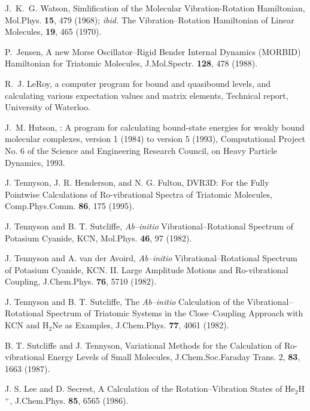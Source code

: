 \begin{thebibliography}{999}
J.~K.~G. Watson,
Simlification of the Molecular Vibration-Rotation
Hamiltonian,
Mol.Phys. {\bf 15}, 479 (1968);
{\it ibid.} 
The Vibration--Rotation Hamiltonian of Linear Molecules,
{\bf 19}, 465 (1970).



P.~Jensen,
A new Morse Oscillator--Rigid Bender Internal
Dynamics (MORBID) Hamiltonian for Triatomic Molecules,
\newblock J.Mol.Spectr. {\bf 128}, 478 (1988).

R.~J. Le{R}oy,
 a 
computer program for bound and quasibound levels, and
calculating various expectation values and matrix elements,
\newblock Technical report, University of Waterloo.

J.~M. Hutson,
: A program for calculating bound-state energies for weakly
bound molecular complexes, version 1 (1984) to version 5 (1993),
\newblock Computational Project No. 6 of the Science and Engineering Research
 Council, on Heavy Particle Dynamics, 1993.

J. Tennyson, J. R. Henderson, and N. G. Fulton,
DVR3D: For the Fully Pointwise Calculations of Ro-vibrational
Spectra of Triatomic Molecules,
Comp.Phys.Comm. {\bf 86}, 175 (1995).



J. Tennyson and B. T. Sutcliffe, 
{\it Ab--initio} Vibrational--Rotational Spectrum of Potasium Cyanide,
KCN,
Mol.Phys. {\bf 46}, 97 (1982).


J. Tennyson and A. van der Avoird, 
{\it Ab--initio} Vibrational--Rotational Spectrum
of Potasium Cyanide, KCN. II. Large Amplitude Motions
and Ro-vibrational Coupling,
J.Chem.Phys. 
{\bf 76}, 5710 (1982).


J. Tennyson and B. T. Sutcliffe, 
The {\it Ab--initio} Calculation of the 
Vibrational--Rotational Spectrum of Triatomic Systems in the  
Close--Coupling Approach with KCN and H$_2$Ne as Examples,
J.Chem.Phys. {\bf 77}, 4061 (1982).


B. T. Sutcliffe and J. Tennyson, 
Variational Methods for the Calculation of Ro-vibrational Energy
Levels of Small Molecules,
J.Chem.Soc.Faraday Trans. 2, 
{\bf 83}, 1663 (1987).


J. S. Lee and D. Secrest, 
A Calculation of the Rotation--Vibration States of He$_2$H$^+$,
J.Chem.Phys. {\bf 85}, 6565 (1986).


\end{thebibliography}
